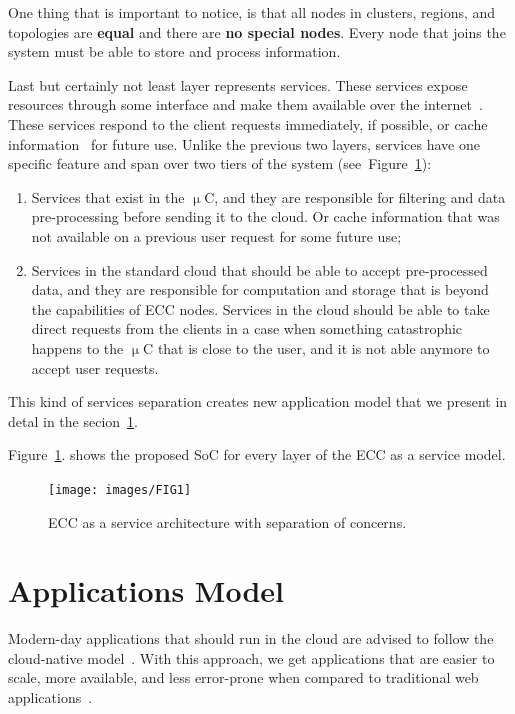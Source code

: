 \noindent
One thing that is important to notice, is that all nodes in clusters, regions, and topologies are \textbf{equal} and there are \textbf{no special nodes}. Every node that joins the system must be able to store and process information.

Last but certainly not least layer represents services. These services expose resources through some interface and make them available over the internet~\cite{JinCJL14}. These services respond to the client requests immediately, if possible, or cache information~\cite{SatyanarayananBCD09,YaoXWYZP20} for future use. Unlike the previous two layers, services have one specific feature and span over two tiers of the system (see~Figure~\ref{fig:fig10}):

\begin{enumerate}[start=1,label={(\bfseries \roman*)}]\label{services}
	\item Services that exist in the $\upmu$C, and they are responsible for filtering and data pre-processing before sending it to the cloud. Or cache information that was not available on a previous user request for some future use;
	\item Services in the standard cloud that should be able to accept pre-processed data, and they are responsible for computation and storage that is beyond the capabilities of ECC nodes. Services in the cloud should be able to take direct requests from the clients in a case when something catastrophic happens to the $\upmu$C that is close to the user, and it is not able anymore to accept user requests.
\end{enumerate}

\noindent
This kind of services separation creates new application model that we present in detal in the secion~\ref{sec:application_model}. 

Figure~\ref{fig:fig10}. shows the proposed SoC for every layer of the ECC as a service model.

\begin{figure}[H]
	\texttt{[image: images/FIG1]}
	\vspace{-0.7cm}
	\caption{ECC as a service architecture with separation of concerns.}
	\label{fig:fig10}
\end{figure}
%
%
\section{Applications Model}\label{sec:application_model}
%
Modern-day applications that should run in the cloud are advised to follow the cloud-native model~\cite{GannonBS17}. With this approach, we get applications that are easier to scale, more available, and less error-prone when compared to traditional web applications~\cite{GannonBS17}. 

